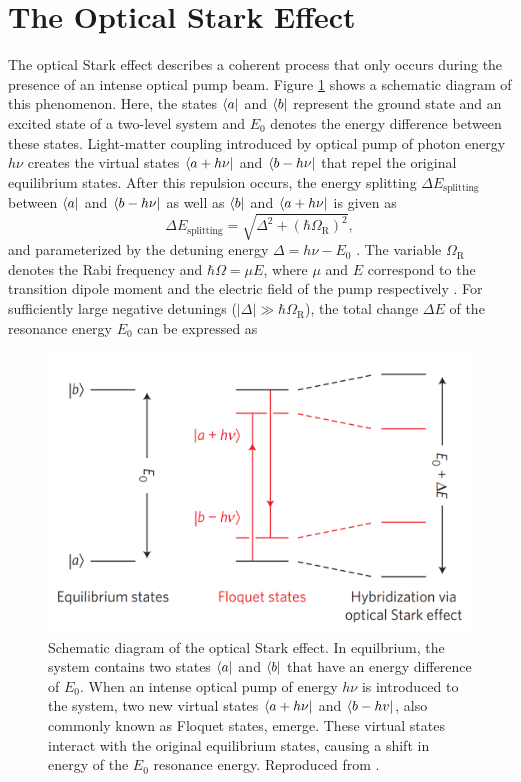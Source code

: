 \section{The Optical Stark Effect}
\label{sec:optical_stark_effect}

The optical Stark effect describes a coherent process that only occurs during the presence of an intense optical pump beam. Figure \ref{fig:optical_stark_effect_schematic_sie} shows a schematic diagram of this phenomenon. Here, the states $\bra{a}$ and $\bra{b}$ represent the ground state and an excited state of a two-level system and $E_0$ denotes the energy difference between these states. Light-matter coupling introduced by optical pump of photon energy $h \nu$ creates the virtual states $\bra{a + h \nu}$ and $\bra{b - h \nu}$ that repel the original equilibrium states. After this repulsion occurs, the energy splitting $\Delta E_\text{splitting}$ between $\bra{a}$  and $\bra{b - h \nu}$ as well as $\bra{b}$ and $\bra{a + h \nu}$ is given as
\begin{equation}
	\Delta E_\text{splitting} = \sqrt{\Delta^2 + (\hbar\Omega_\text{R})^2 },
\end{equation}
and parameterized by the detuning energy $\Delta = h \nu - E_0$ \cite{mysyrowicz1986dressed}. The variable $\Omega_\text{R}$ denotes the Rabi frequency and $\hbar \Omega = \mu E$, where $\mu$ and $E$ correspond to the transition dipole moment and the electric field of the pump respectively
\cite{mysyrowicz1986dressed}. For sufficiently large negative detunings ($|\Delta| \gg \hbar \Omega_\text{R}$), the total change $\Delta E$ of the resonance energy $E_0$ can be expressed as
\begin{figure}[ht]
	\centering
	\includegraphics[scale=0.3]{images/chapter_prior_works/optical_stark_effect_sie_2014}
	\caption{Schematic diagram of the optical Stark effect. In equilbrium, the system contains two states $\bra{a}$ and $\bra{b}$ that have an energy difference of $E_0$. When an intense optical pump of energy $h \nu$ is introduced to the system, two new virtual states $\bra{a + h \nu }$ and $\bra{b - hv}$, also commonly known as Floquet states, emerge. These virtual states interact with the original equilibrium states, causing a shift in energy of the $E_0$ resonance energy. Reproduced from \cite{sie2015valley}.}
	\label{fig:optical_stark_effect_schematic_sie}
\end{figure}

